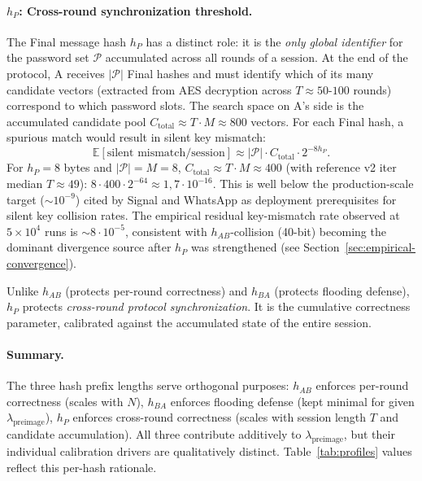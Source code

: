 \documentclass[11pt,a4paper]{article}
\begin{document}
\paragraph{$h_P$: Cross-round synchronization threshold.} The Final message hash $h_P$ has a distinct role: it is the \emph{only global identifier} for the password set $\mathcal{P}$ accumulated across all rounds of a session. At the end of the protocol, A receives $|\mathcal{P}|$ Final hashes and must identify which of its many candidate vectors (extracted from AES decryption across $T \approx 50$-$100$ rounds) correspond to which password slots. The search space on A's side is the accumulated candidate pool $C_\text{total} \approx T \cdot M \approx 800$ vectors. For each Final hash, a spurious match would result in silent key mismatch:
\[
\mathbb{E}[\text{silent mismatch}/\text{session}] \approx |\mathcal{P}| \cdot C_\text{total} \cdot 2^{-8 h_P}.
\]
For $h_P = 8$ bytes and $|\mathcal{P}| = M = 8$, $C_\text{total} \approx T \cdot M \approx 400$ (with reference v2 iter median $T \approx 49$): $8 \cdot 400 \cdot 2^{-64} \approx 1{,}7 \cdot 10^{-16}$. This is well below the production-scale target ($\sim 10^{-9}$) cited by Signal and WhatsApp as deployment prerequisites for silent key collision rates. The empirical residual key-mismatch rate observed at $5 \times 10^4$ runs is $\sim 8 \cdot 10^{-5}$, consistent with $h_{AB}$-collision (40-bit) becoming the dominant divergence source after $h_P$ was strengthened (see Section~\ref{sec:empirical-convergence}).

Unlike $h_{AB}$ (protects per-round correctness) and $h_{BA}$ (protects flooding defense), $h_P$ protects \emph{cross-round protocol synchronization}. It is the cumulative correctness parameter, calibrated against the accumulated state of the entire session.

\paragraph{Summary.} The three hash prefix lengths serve orthogonal purposes: $h_{AB}$ enforces per-round correctness (scales with $N$), $h_{BA}$ enforces flooding defense (kept minimal for given $\lambda_\text{preimage}$), $h_P$ enforces cross-round correctness (scales with session length $T$ and candidate accumulation). All three contribute additively to $\lambda_\text{preimage}$, but their individual calibration drivers are qualitatively distinct. Table~\ref{tab:profiles} values reflect this per-hash rationale.
\end{document}
